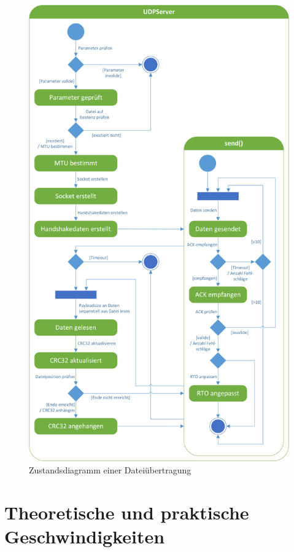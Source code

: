 \begin{figure}
	\centering
	\includegraphics[width=\textwidth,height=\textheight,keepaspectratio]{assets/UDPClient.png}
	\caption{Zustandsdiagramm einer Dateiübertragung}
\end{figure}

\chapter{Theoretische und praktische Geschwindigkeiten}

